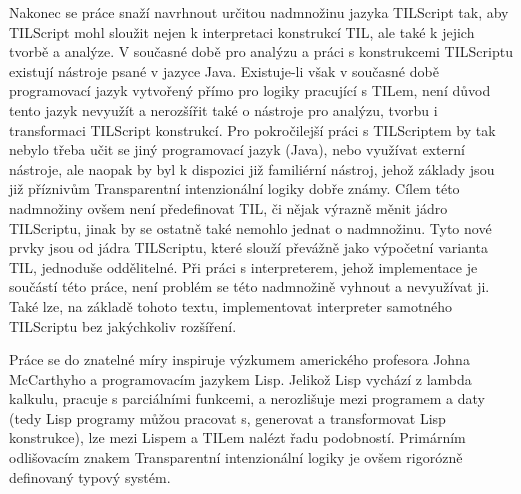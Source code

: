 Nakonec se práce snaží navrhnout určitou nadmnožinu jazyka TILScript tak, aby TILScript mohl
sloužit nejen k interpretaci konstrukcí TIL, ale také k jejich tvorbě a analýze. V současné době
pro analýzu a práci s konstrukcemi TILScriptu existují nástroje psané v jazyce Java. Existuje-li
však v současné době programovací jazyk vytvořený přímo pro logiky pracující s TILem, není důvod
tento jazyk nevyužít a nerozšířit také o nástroje pro analýzu, tvorbu i transformaci TILScript
konstrukcí. Pro pokročilejší práci s TILScriptem by tak nebylo třeba učit se jiný programovací
jazyk (Java), nebo využívat externí nástroje, ale naopak by byl k dispozici již familiérní nástroj,
jehož základy jsou již příznivům Transparentní intenzionální logiky dobře známy. Cílem této
nadmnožiny ovšem není předefinovat TIL, či nějak výrazně měnit jádro TILScriptu, jinak by se
ostatně také nemohlo jednat o nadmnožinu. Tyto nové prvky jsou od jádra TILScriptu, které slouží
převážně jako výpočetní varianta TIL, jednoduše oddělitelné. Při práci s interpreterem, jehož
implementace je součástí této práce, není problém se této nadmnožině vyhnout a nevyužívat ji.
Také lze, na základě tohoto textu, implementovat interpreter samotného TILScriptu bez jakýchkoliv
rozšíření.

Práce se do znatelné míry inspiruje výzkumem amerického profesora Johna McCarthyho a programovacím
jazykem Lisp. Jelikož Lisp vychází z lambda kalkulu, pracuje s parciálními funkcemi, a nerozlišuje
mezi programem a daty (tedy Lisp programy můžou pracovat s, generovat a transformovat Lisp
konstrukce), lze mezi Lispem a TILem nalézt řadu podobností. Primárním odlišovacím znakem
Transparentní intenzionální logiky je ovšem rigorózně definovaný typový systém.

\endinput
